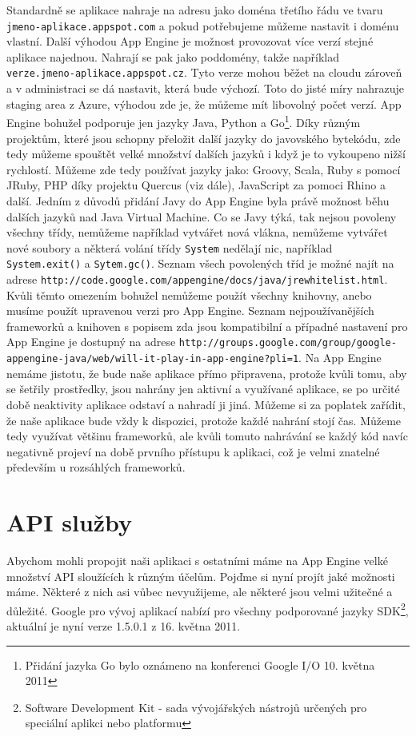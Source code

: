 Standardně se aplikace nahraje na adresu jako doména třetího řádu ve
tvaru \verb|jmeno-aplikace.appspot.com| a pokud potřebujeme můžeme nastavit i doménu vlastní. Další výhodou App Engine je možnost provozovat více verzí stejné aplikace najednou. Nahrají se pak jako poddomény, takže například \verb|verze.jmeno-aplikace.appspot.cz|. Tyto verze mohou běžet na cloudu zároveň a v administraci se dá nastavit, která bude výchozí. Toto do jisté míry nahrazuje staging area z Azure, výhodou zde je, že můžeme mít libovolný počet verzí. App Engine bohužel podporuje jen jazyky Java, Python a Go\footnote{Přidání jazyka Go bylo oznámeno na konferenci Google I/O 10. května 2011}. Díky různým projektům, které jsou schopny přeložit další jazyky do javovského bytekódu, zde tedy můžeme spouštět velké množství dalších jazyků i když je to vykoupeno nižší rychlostí. Můžeme zde tedy používat jazyky jako: Groovy, Scala, Ruby s pomocí JRuby, PHP díky projektu Quercus (viz dále), JavaScript za pomoci Rhino a další. Jedním z důvodů přidání Javy do App Engine byla právě možnost běhu dalších jazyků nad Java Virtual Machine. Co se Javy týká, tak nejsou povoleny všechny třídy, nemůžeme například vytvářet nová vlákna, nemůžeme vytvářet nové soubory a některá volání třídy \verb|System| nedělají nic, například \verb|System.exit()| a \verb|Sytem.gc()|. Seznam všech povolených tříd je možné najít na adrese \verb|http://code.google.com/appengine/docs/java/jrewhitelist.html|. Kvůli těmto omezením bohužel nemůžeme použít všechny knihovny, anebo musíme použít upravenou verzi pro App Engine. Seznam nejpoužívanějších frameworků a knihoven s popisem zda jsou kompatibilní a případné nastavení pro App Engine je dostupný na adrese \verb|http://groups.google.com/group/google-appengine-java/web/will-it-play-in-app-engine?pli=1|. Na App Engine nemáme jistotu, že bude naše aplikace přímo připravena, protože kvůli tomu, aby se šetřily prostředky, jsou nahrány jen aktivní a využívané aplikace, se po určité době neaktivity aplikace odstaví a nahradí ji jiná. Můžeme si za poplatek zařídit, že naše aplikace bude vždy k dispozici, protože každé nahrání stojí čas. Můžeme tedy využívat většinu frameworků, ale kvůli tomuto nahrávání se každý kód navíc negativně projeví na době prvního přístupu k aplikaci, což je velmi znatelné především u rozsáhlých frameworků.

\section{API služby}
Abychom mohli propojit naši aplikaci s ostatními máme na App Engine velké množství API sloužících k různým účelům. Pojďme si nyní projít jaké možnosti máme. Některé z nich asi vůbec nevyužijeme, ale některé jsou velmi užitečné a důležité. Google pro vývoj aplikací nabízí pro všechny podporované jazyky SDK\footnote{Software Development Kit - sada vývojářských nástrojů určených pro speciální aplikci nebo platformu}, aktuální je nyní verze 1.5.0.1 z 16. května 2011.

